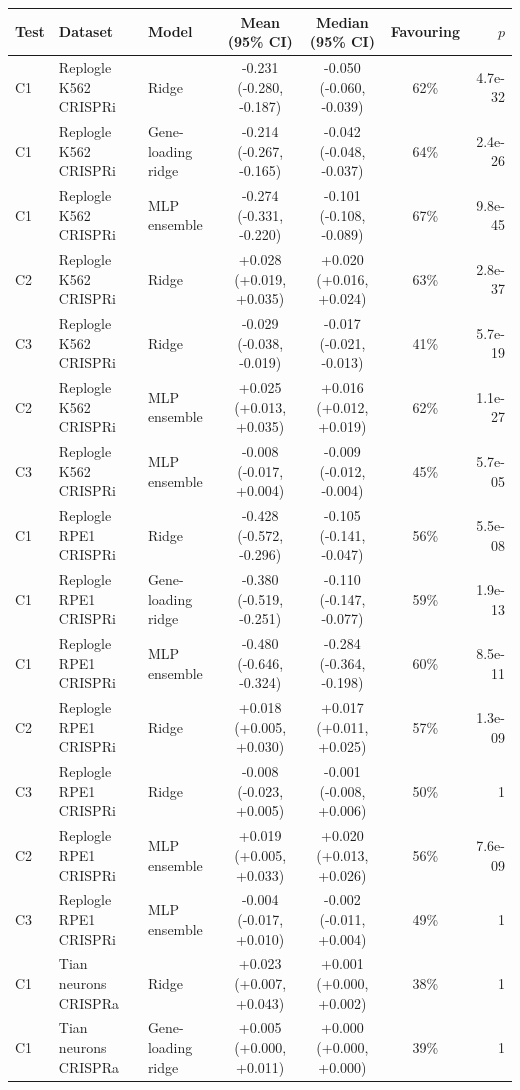 \begin{tabular}{lllcccr}
\toprule
Test & Dataset & Model & Mean (95\% CI) & Median (95\% CI) & Favouring & $p$ \\
\midrule
C1 & Replogle K562 CRISPRi & Ridge & -0.231 (-0.280, -0.187) & -0.050 (-0.060, -0.039) & 62\% & 4.7e-32 \\
C1 & Replogle K562 CRISPRi & Gene-loading ridge & -0.214 (-0.267, -0.165) & -0.042 (-0.048, -0.037) & 64\% & 2.4e-26 \\
C1 & Replogle K562 CRISPRi & MLP ensemble & -0.274 (-0.331, -0.220) & -0.101 (-0.108, -0.089) & 67\% & 9.8e-45 \\
C2 & Replogle K562 CRISPRi & Ridge & +0.028 (+0.019, +0.035) & +0.020 (+0.016, +0.024) & 63\% & 2.8e-37 \\
C3 & Replogle K562 CRISPRi & Ridge & -0.029 (-0.038, -0.019) & -0.017 (-0.021, -0.013) & 41\% & 5.7e-19 \\
C2 & Replogle K562 CRISPRi & MLP ensemble & +0.025 (+0.013, +0.035) & +0.016 (+0.012, +0.019) & 62\% & 1.1e-27 \\
C3 & Replogle K562 CRISPRi & MLP ensemble & -0.008 (-0.017, +0.004) & -0.009 (-0.012, -0.004) & 45\% & 5.7e-05 \\
C1 & Replogle RPE1 CRISPRi & Ridge & -0.428 (-0.572, -0.296) & -0.105 (-0.141, -0.047) & 56\% & 5.5e-08 \\
C1 & Replogle RPE1 CRISPRi & Gene-loading ridge & -0.380 (-0.519, -0.251) & -0.110 (-0.147, -0.077) & 59\% & 1.9e-13 \\
C1 & Replogle RPE1 CRISPRi & MLP ensemble & -0.480 (-0.646, -0.324) & -0.284 (-0.364, -0.198) & 60\% & 8.5e-11 \\
C2 & Replogle RPE1 CRISPRi & Ridge & +0.018 (+0.005, +0.030) & +0.017 (+0.011, +0.025) & 57\% & 1.3e-09 \\
C3 & Replogle RPE1 CRISPRi & Ridge & -0.008 (-0.023, +0.005) & -0.001 (-0.008, +0.006) & 50\% & 1 \\
C2 & Replogle RPE1 CRISPRi & MLP ensemble & +0.019 (+0.005, +0.033) & +0.020 (+0.013, +0.026) & 56\% & 7.6e-09 \\
C3 & Replogle RPE1 CRISPRi & MLP ensemble & -0.004 (-0.017, +0.010) & -0.002 (-0.011, +0.004) & 49\% & 1 \\
C1 & Tian neurons CRISPRa & Ridge & +0.023 (+0.007, +0.043) & +0.001 (+0.000, +0.002) & 38\% & 1 \\
C1 & Tian neurons CRISPRa & Gene-loading ridge & +0.005 (+0.000, +0.011) & +0.000 (+0.000, +0.000) & 39\% & 1 \\

\end{tabular}

